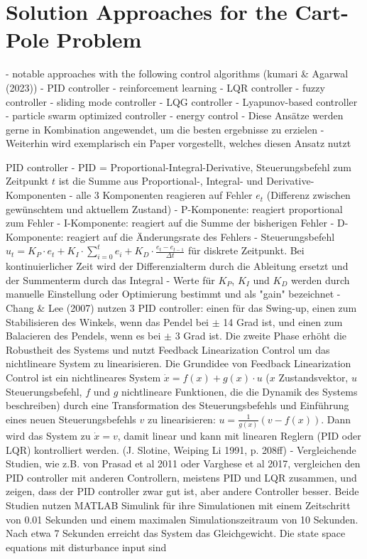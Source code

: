 \section{Solution Approaches for the Cart-Pole Problem}

- notable approaches with the following control algorithms (kumari & Agarwal (2023))
- PID controller
- reinforcement learning
- LQR controller
- fuzzy controller
- sliding mode controller
- LQG controller
- Lyapunov-based controller
- particle swarm optimized controller
- energy control
- Diese Ansätze werden gerne in Kombination angewendet, um die besten ergebnisse zu erzielen
- Weiterhin wird exemplarisch ein Paper vorgestellt, welches diesen Ansatz nutzt

PID controller
- PID = Proportional-Integral-Derivative, Steuerungsbefehl zum Zeitpunkt $t$ ist die Summe aus Proportional-, Integral- und Derivative-Komponenten
- alle 3 Komponenten reagieren auf Fehler $e_t$ (Differenz zwischen gewünschtem und aktuellem Zustand)
- P-Komponente: reagiert proportional zum Fehler
- I-Komponente: reagiert auf die Summe der bisherigen Fehler
- D-Komponente: reagiert auf die Änderungsrate des Fehlers
- Steuerungsbefehl $u_t = K_P\cdot e_t + K_I\cdot\sum_{i=0}^t e_i + K_D\cdot\frac{e_t - e_{t-1}}{\Delta t}$ für diskrete Zeitpunkt. Bei kontinuierlicher Zeit wird der Differenzialterm durch die Ableitung ersetzt und der Summenterm durch das Integral
- Werte für $K_P$, $K_I$ und $K_D$ werden durch manuelle Einstellung oder Optimierung bestimmt und als "gain" bezeichnet
- Chang & Lee (2007) nutzen 3 PID controller:  einen für das Swing-up, einen zum Stabilisieren des Winkels, wenn das Pendel bei $\pm$ 14 Grad ist, und einen zum Balacieren des Pendels, wenn es bei $\pm$ 3 Grad ist. Die zweite Phase erhöht die Robustheit des Systems und nutzt Feedback Linearization Control um das nichtlineare System zu linearisieren. Die Grundidee von Feedback Linearization Control ist ein nichtlineares System $\dot{x} = f(x) + g(x)\cdot u$ ($x$ Zustandsvektor, $u$ Steuerungsbefehl, $f$ und $g$ nichtlineare Funktionen, die die Dynamik des Systems beschreiben) durch eine Transformation des Steuerungsbefehls und Einführung eines neuen Steuerungsbefehls $v$ zu linearisieren: $u = \frac{1}{g(x)}(v - f(x))$. Dann wird das System zu $\dot{x}=v$, damit linear und kann mit linearen Reglern (PID oder LQR) kontrolliert werden. (J. Slotine, Weiping Li 1991, p. 208ff)
- Vergleichende Studien, wie z.B. von Prasad et al 2011 oder Varghese et al 2017, vergleichen den PID controller mit anderen Controllern, meistens PID und LQR zusammen, und zeigen, dass der PID controller zwar gut ist, aber andere Controller besser. Beide Studien nutzen MATLAB Simulink für ihre Simulationen mit einem Zeitschritt von 0.01 Sekunden und einem maximalen Simulationszeitraum von 10 Sekunden. Nach etwa 7 Sekunden erreicht das System das Gleichgewicht. Die state space equations mit disturbance input sind
